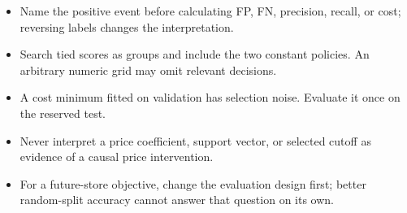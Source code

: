 \begin{itemize}
\item Name the positive event before calculating FP, FN, precision, recall, or cost; reversing labels changes the interpretation.
\item Search tied scores as groups and include the two constant policies. An arbitrary numeric grid may omit relevant decisions.
\item A cost minimum fitted on validation has selection noise. Evaluate it once on the reserved test.
\item Never interpret a price coefficient, support vector, or selected cutoff as evidence of a causal price intervention.
\item For a future-store objective, change the evaluation design first; better random-split accuracy cannot answer that question on its own.
\end{itemize}

